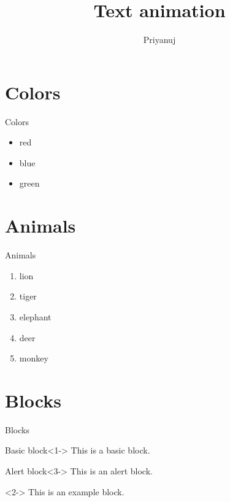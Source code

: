 \documentclass{beamer}
\title{Text animation}
\author{Priyanuj}
\date{}
\begin{document}
	\begin{frame}
		\maketitle
	\end{frame}
	
	\section{Colors}
	\begin{frame}{Colors}
		\begin{itemize}
			\item red \pause
			\item blue \pause
			\item green
		\end{itemize}
	\end{frame}
	
	\section{Animals}
	\begin{frame}{Animals}
		\begin{enumerate}
			\item<1-> lion
			\item<3> tiger
			\item<4-> elephant
			\item<2-> deer
			\item<5-> monkey
		\end{enumerate}
	\end{frame}
	\section{Blocks}
	\begin{frame}{Blocks}
		\begin{block}{Basic block}<1->
			This is a basic block.
		\end{block}
		
		\begin{alertblock}{Alert block}<3->
			This is an alert block.
		\end{alertblock}
		
		\begin{example}<2->
			This is an example block.
		\end{example}
	\end{frame}
	
\end{document}

